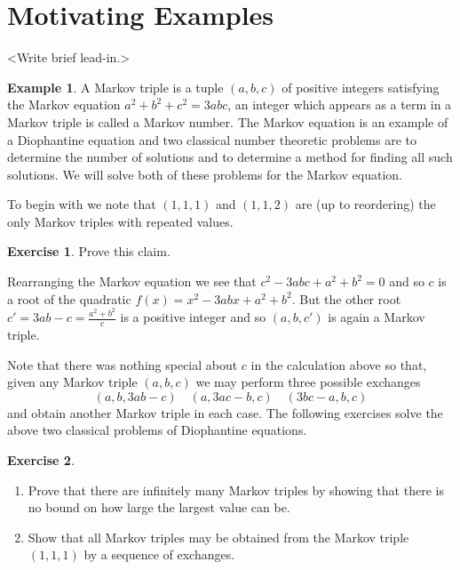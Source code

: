 \documentclass{amsart}
\theoremstyle{definition}
\newtheorem{example}[theorem]{Example}
\newtheorem{subexercise}{Exercise}[theorem]
\theoremstyle{remark}
\numberwithin{equation}{section}
\begin{document}
\section{Motivating Examples}\label{sec:motivation}
  <Write brief lead-in.>

  \begin{example}
    A Markov triple is a tuple $(a,b,c)$ of positive integers satisfying the Markov equation $a^2+b^2+c^2=3abc$, an integer which appears as a term in a Markov triple is called a Markov number.  The Markov equation is an example of a Diophantine equation and two classical number theoretic problems are to determine the number of solutions and to determine a method for finding all such solutions.  We will solve both of these problems for the Markov equation.

    To begin with we note that $(1,1,1)$ and $(1,1,2)$ are (up to reordering) the only Markov triples with repeated values.
    \begin{subexercise}
      Prove this claim.
    \end{subexercise}
    Rearranging the Markov equation we see that $c^2-3abc+a^2+b^2=0$ and so $c$ is a root of the quadratic $f(x)=x^2-3abx+a^2+b^2$.  But the other root $c'=3ab-c=\frac{a^2+b^2}{c}$ is a positive integer and so $(a,b,c')$ is again a Markov triple.  

    Note that there was nothing special about $c$ in the calculation above so that, given any Markov triple $(a,b,c)$ we may perform three possible exchanges 
    \[(a,b,3ab-c)\quad(a,3ac-b,c)\quad(3bc-a,b,c)\]
    and obtain another Markov triple in each case.  The following exercises solve the above two classical problems of Diophantine equations.
    \begin{subexercise}\mbox{}
      \begin{enumerate}
        \item Prove that there are infinitely many Markov triples by showing that there is no bound on how large the largest value can be.
        \item Show that all Markov triples may be obtained from the Markov triple $(1,1,1)$ by a sequence of exchanges.
      \end{enumerate}
    \end{subexercise}
  \end{example}
\end{document}
